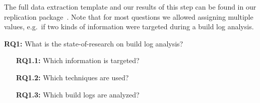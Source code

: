 The full data extraction template and our results of this step can be
found in our replication package~\cite{brandt2020chunk-replication}.
Note that for most questions we allowed assigning multiple values,
e.g.\ if
two kinds of information were targeted during a build log analysis.

\begin{simplebox}[attach boxed title to top center={yshift=-6mm}]
{\textbf{RQ1:} What is the state-of-research on build
log analysis?}
\begin{itemize}
  \item[\textbf{RQ1.1:}] Which information is targeted?
  \item[\textbf{RQ1.2:}] Which techniques are used?
  \item[\textbf{RQ1.3:}] Which build logs are analyzed?
\end{itemize}
\end{simplebox}

